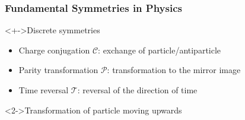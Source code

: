 \begin{frame}[t]
 \frametitle{Fundamental Symmetries in Physics}
 \begin{block}<+->{Discrete symmetries}
  \begin{itemize}
   \item<+-> \alert{Charge conjugation $\mathcal{C}$}: exchange of particle/antiparticle
   \item<+-> \alert{Parity transformation $\mathcal{P}$}: transformation to the mirror image
   \item<+-> \alert{Time reversal $\mathcal{T}$}: reversal of the direction of time
  \end{itemize}
 \end{block}
 \begin{block}<2->{Transformation of particle moving upwards}
  \begin{center}
  \end{center}
 \end{block}
\end{frame}
